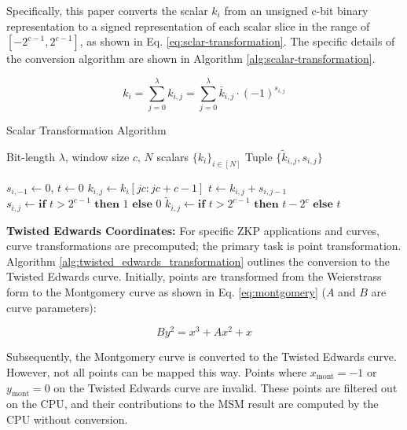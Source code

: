 \documentclass[journal=tches,final]{iacrtrans}
\begin{document}
Specifically, this paper converts the scalar $k_i$ from an unsigned c-bit binary representation to a signed representation of each scalar slice in the range of $\left[-2^{c-1}, 2^{c-1}\right]$, as shown in Eq. \eqref{eq:sclar-transformation}. The specific details of the conversion algorithm are shown in Algorithm \ref{alg:scalar-transformation}.

\begin{equation}
\label{eq:sclar-transformation}
k_i=\sum_{j=0}^{\lambda} k_{i, j}=\sum_{j=0}^{\lambda} \bar{k}_{i, j} \cdot(-1)^{s_{i, j}}
\end{equation}

\begin{algorithm}
\label{alg:scalar-transformation}
\caption{Scalar Transformation Algorithm}
\begin{algorithmic}[1] %
\REQUIRE Bit-length $\lambda$, window size $c$, $N$ scalars $\{k_i\}_{i \in [N]}$
\ENSURE Tuple $\{\widetilde{k}_{i,j}, s_{i,j}\}$

\STATE $s_{i,-1} \gets 0$, $t \gets 0$
    \STATE $k_{i,j} \gets k_i[jc : jc + c - 1]$
    \STATE $t \gets k_{i,j} + s_{i,j-1}$
    \STATE $s_{i,j} \gets \textbf{if } t > 2^{c-1} \textbf{ then } 1 \textbf{ else } 0$
    \STATE $\widetilde{k}_{i,j} \gets \textbf{if } t > 2^{c-1} \textbf{ then } t - 2^c \textbf{ else } t$
\ENDFOR

\end{algorithmic}
\end{algorithm}

\textbf{Twisted Edwards Coordinates:} For specific ZKP applications and curves, curve transformations are precomputed; the primary task is point transformation. Algorithm \ref{alg:twisted_edwards_transformation} outlines the conversion to the Twisted Edwards curve. Initially, points are transformed from the Weierstrass form to the Montgomery curve as shown in Eq. \eqref{eq:montgomery} ($A$ and $B$ are curve parameters):

\begin{equation}
\label{eq:montgomery}
B y^2 = x^3 + A x^2 + x
\end{equation}

Subsequently, the Montgomery curve is converted to the Twisted Edwards curve. However, not all points can be mapped this way. Points where \( x_{\text{mont}} = -1 \) or \( y_{\text{mont}} = 0 \) on the Twisted Edwards curve are invalid. These points are filtered out on the CPU, and their contributions to the MSM result are computed by the CPU without conversion.
\end{document}
